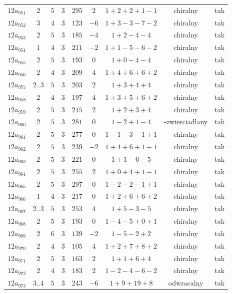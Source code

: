 \begin{longtable}{ccccccccc}
$12a_{951}$ & $2$ & $5$ & $3$ & $295$ & $2$ & $1+2+2+1-1$ & chiralny & tak \\
$12a_{952}$ & $3$ & $4$ & $3$ & $123$ & $-6$ & $1+3-3-7-2$ & chiralny & tak \\
$12a_{953}$ & $2$ & $5$ & $3$ & $185$ & $-4$ & $1+2-4-4$ & chiralny & tak \\
$12a_{954}$ & $1$ & $4$ & $3$ & $211$ & $-2$ & $1+1-5-6-2$ & chiralny & tak \\
$12a_{955}$ & $2$ & $5$ & $3$ & $193$ & $0$ & $1+0-4-4$ & chiralny & tak \\
$12a_{956}$ & $2$ & $4$ & $3$ & $209$ & $4$ & $1+4+6+6+2$ & chiralny & tak \\
$12a_{957}$ & $2..3$ & $5$ & $3$ & $203$ & $2$ & $1+3+4+4$ & chiralny & tak \\
$12a_{958}$ & $2$ & $4$ & $3$ & $197$ & $4$ & $1+3+5+6+2$ & chiralny & tak \\
$12a_{959}$ & $2$ & $5$ & $3$ & $215$ & $2$ & $1+2+3+4$ & chiralny & tak \\
$12a_{960}$ & $2$ & $5$ & $3$ & $281$ & $0$ & $1-2+1-4$ & -zwierciadlany & tak \\
$12a_{961}$ & $2$ & $5$ & $3$ & $277$ & $0$ & $1-1-3-1+1$ & chiralny & tak \\
$12a_{962}$ & $2$ & $5$ & $3$ & $239$ & $-2$ & $1+4+6+1-1$ & chiralny & tak \\
$12a_{963}$ & $2$ & $5$ & $3$ & $221$ & $0$ & $1+1-6-5$ & chiralny & tak \\
$12a_{964}$ & $2$ & $5$ & $3$ & $255$ & $2$ & $1+0+4+1-1$ & chiralny & tak \\
$12a_{965}$ & $2$ & $5$ & $3$ & $297$ & $0$ & $1-2-2-1+1$ & chiralny & tak \\
$12a_{966}$ & $1$ & $4$ & $3$ & $217$ & $0$ & $1+2+6+6+2$ & chiralny & tak \\
$12a_{967}$ & $2..3$ & $5$ & $3$ & $253$ & $4$ & $1+5-3-5$ & chiralny & tak \\
$12a_{968}$ & $2$ & $5$ & $3$ & $193$ & $0$ & $1-4-5+0+1$ & chiralny & tak \\
$12a_{969}$ & $2$ & $6$ & $3$ & $139$ & $-2$ & $1-5-2+2$ & chiralny & tak \\
$12a_{970}$ & $2$ & $4$ & $3$ & $105$ & $4$ & $1+2+7+8+2$ & chiralny & tak \\
$12a_{971}$ & $2$ & $5$ & $3$ & $163$ & $2$ & $1+1+6+4$ & chiralny & tak \\
$12a_{972}$ & $2$ & $4$ & $3$ & $183$ & $2$ & $1-2-4-6-2$ & chiralny & tak \\
$12a_{973}$ & $3..4$ & $5$ & $3$ & $243$ & $-6$ & $1+9+19+8$ & odwracalny & tak \\

\end{longtable}
